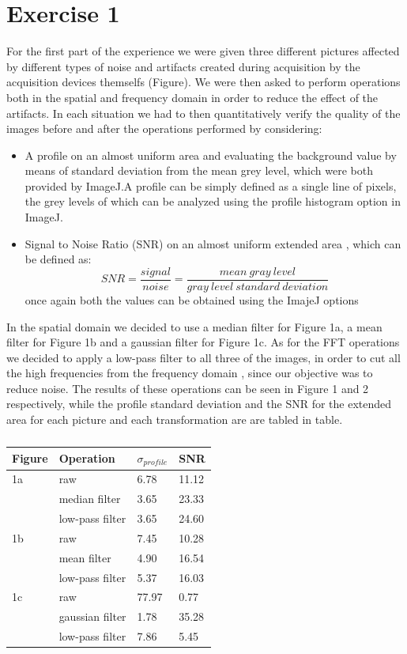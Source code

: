 \documentclass{article}
\begin{document}
\section*{Exercise 1}
For the first part of the experience we were given three different pictures affected by different types of noise and artifacts created during acquisition by the acquisition devices themselfs (Figure). We were then asked to perform operations both in the spatial and frequency domain in order to reduce the effect of the artifacts. In each situation we had to then quantitatively verify the quality of the images before and after the operations performed by considering:
\begin{itemize}
 \item A profile on an almost uniform area and evaluating the background value by means of standard deviation from the mean grey level, which were both provided by ImageJ.A profile can be simply defined as a single line of pixels, the grey levels of which can be analyzed using the profile histogram option in ImageJ.
 \item Signal to Noise Ratio (SNR) on an almost uniform extended area , which can be defined as:
 \begin{equation}
 SNR=\frac{signal}{noise}=\frac{mean\ gray\ level}{gray\ level\ standard\ deviation}
 \end{equation}
 once again both the values can be obtained using the ImajeJ options
\end{itemize}
In the spatial domain we decided to use a median filter for Figure 1a, a mean filter for Figure 1b and a gaussian filter for Figure 1c. As for the FFT operations we decided to apply a low-pass filter to all three of the images, in order to cut all the high frequencies from the frequency domain  , since our objective was to reduce noise. The results of these operations can be seen in Figure 1 and 2 respectively, while the profile standard deviation and the SNR for the extended area for each picture and each transformation are are tabled in table.\\
\begin{table}[h]
	\begin {center}
	\begin{tabular}{| l | l | l | l |}
		\hline
		Figure & Operation & $\sigma_{profile}$ & SNR \\ \hline
		1a & raw & 6.78 & 11.12 \\ \hline
		   & median filter & 3.65 & 23.33 \\ \hline 
		   & low-pass filter & 3.65 & 24.60 \\ \hline 
		1b & raw & 7.45 & 10.28 \\ \hline
		& mean filter & 4.90 & 16.54 \\ \hline 
		& low-pass filter & 5.37 & 16.03 \\ \hline 
		1c & raw & 77.97 & 0.77 \\ \hline
		& gaussian filter & 1.78 & 35.28 \\ \hline 
		& low-pass filter & 7.86 & 5.45 \\ \hline 
	\end{tabular}
	\caption{}
	\end{center}
\end{table}
\end{document}
